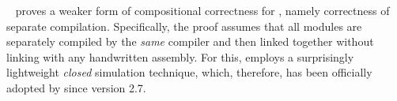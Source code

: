 \myparagraph{\scc{}}
%
\scc{}~\cite{kang:scc} proves a weaker form of compositional correctness for \cc{},
namely correctness of separate compilation.
Specifically, the proof assumes that all modules
are separately compiled by the \emph{same} compiler and then linked
together without linking with any handwritten assembly.
For this, \scc{} employs a surprisingly lightweight \emph{closed} simulation technique,
which, therefore, has been officially adopted by \cc{} since version 2.7.





%






